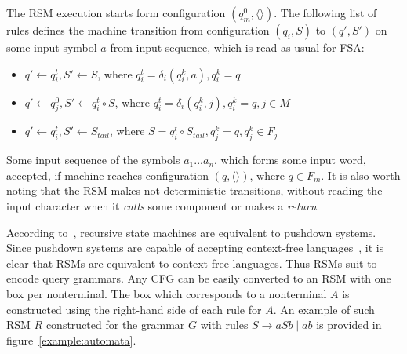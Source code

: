 The RSM execution starts form configuration $(q_m^0, \langle\rangle)$. 
The following list of rules defines the machine transition from configuration $(q_i,S)$ to $(q',S')$ on some input symbol $a$ from input sequence, which is read as usual for FSA:

\begin{itemize}
    \item $q' \gets q_i^t, S' \gets S$, where $q_i^t = \delta_i (q_i^k, a), q_i^k = q$
    \item $q' \gets q_j^0, S' \gets q_i^t \circ S$, where $q_i^t = \delta_i (q_i^k, j),  q_i^k = q, j \in M$
    \item $q' \gets q_i^t, S' \gets S_{tail}$, where $S = q_i^t \circ S_{tail}, q_j^k = q, q_j^k \in F_j$
\end{itemize}

Some input sequence of the symbols $a_1 ... a_n$, which forms some input word, accepted, if machine reaches configuration $(q,\langle\rangle)$, where $q \in F_m$. It is also worth noting that the  RSM makes not deterministic transitions, without reading the input character when it \textit{calls} some component or  makes a \textit{return}.



According to~\cite{rsm:analysis:10.1007/3-540-44585-4_18}, recursive state machines are equivalent to pushdown systems.
Since pushdown systems are capable of accepting context-free languages~\cite{automata:theory:10.5555/1177300}, it is clear that RSMs are equivalent to context-free languages.
Thus RSMs suit to encode query grammars.
Any CFG can be easily converted to an RSM with one box per nonterminal.
The box which corresponds to a nonterminal $A$ is constructed using the right-hand side of each rule for $A$.
An example of such RSM $R$ constructed for the grammar $G$ with rules $S \to a S b \mid a b$ is provided in figure~\ref{example:automata}.

